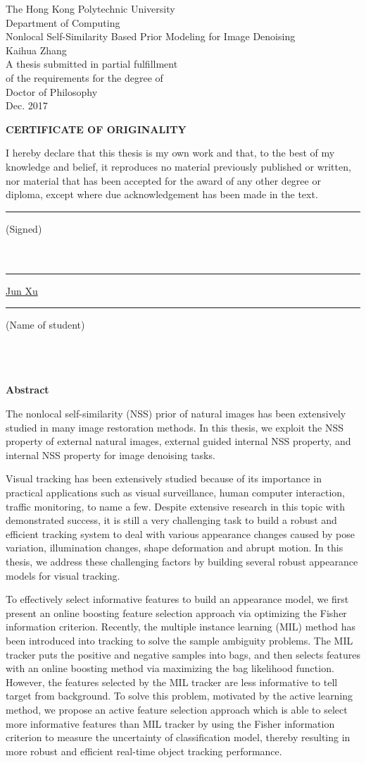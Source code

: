 \documentclass[12pt,oneside]{report}
\makeatletter
\numberwithin{figure}{chapter}
\newenvironment{preliminary}%
{\pagestyle{plain}\pagenumbering{roman}}%
{\pagenumbering{arabic}}
\newcommand\isdefinedsig[1]{%
  \edef\@tempa{#1}%
  \def\@tempb{}%
  \ifx\@tempa\@tempb
	\else\rule[-4.5pt]{4cm}{0.5pt}\signname\\ \\{#1}\\
  \fi
}
\newcommand\isdefinedsigname[1]{%
  \edef\@tempa{#1}%
  \def\@tempb{}%
  \ifx\@tempa\@tempb
	\else\rule[-5pt]{0.05cm}{0.5pt}\underline{Jun Xu}\rule[-5pt]{1.5cm}{0.5pt}\stuname\\ \\{#1}\\%
  \fi
}
\newcommand\isdefinedspinetitle[1]{%
  \edef\@tempa{#1}%
  \def\@tempb{}%
  \ifx\@tempa\@tempb
	\else (Spine title: #1)\\
  \fi
}
\newcommand{\signname}{(Signed)}
\newcommand{\stuname}{(Name of student)}
\newcommand{\department}{Computing}
\newcommand{\degree}{Doctor of Philosophy}
\newcommand{\firstname}{Kaihua}
\newcommand{\middlename}{}
\newcommand{\lastname}{Zhang}
\newcommand{\authorname}{{\firstname} {\middlename} {\lastname}}
\newcommand{\titl}{Real-time and Robust Visual Tracking}
\newcommand{\thesisformat}{Monograph} %
\newcommand{\gyear}{\number\year}
\renewcommand{\maketitle}
{\begin{titlepage}
   \setcounter{page}{1}
   \begin{large}
   \begin{center}
      \mbox{}
      \vfill
	{\LARGE The Hong Kong Polytechnic University} \\
    {\Large Department of Computing}\\
      \vfill
      {\LARGE Nonlocal Self-Similarity Based Prior Modeling for Image Denoising} \\
      \vfill
       {\firstname}  {\lastname}\\

      \vfill
		A thesis submitted in partial fulfillment\\
		of the requirements for the degree of\\
		\degree\\
		\vfill
		\vfill
     Dec. 2017\\
      \vspace*{.2in}


   \end{center}
   \end{large}
   \end{titlepage}

}%
\newcommand{\makecert}{
   \setcounter{page}{2}
\vfill
\begin{center}
\large
\textbf{CERTIFICATE OF ORIGINALITY}\\
\vfill
\end{center}

\vfill
I hereby declare that this thesis is my own work and that, to the best of my knowledge and belief, it reproduces no material previously published or written, nor material that has been accepted for the award of any other degree or diploma, except where due acknowledgement has been made in the text. \\
\vfill
\vfill
\vfill
\hspace{2.5in}\isdefinedsig{ }
\vfill
\hspace{2.5in}\isdefinedsigname{ }\\
\vfill
\vfill
\vfill
\vfill
}
\makeatother
\begin{document}


\begin{preliminary}

\maketitle
{}
\makecert
\newpage


\Large\begin{center}\textbf{Abstract}\end{center}\normalsize


The nonlocal self-similarity (NSS) prior of natural images has been extensively studied in many image restoration methods. In this thesis, we exploit the NSS property of external natural images, external guided internal NSS property, and internal NSS property for image denoising tasks.



Visual tracking has been extensively studied because of its importance in practical applications such as visual surveillance, human computer interaction, traffic monitoring, to name a few. Despite extensive research in this topic with demonstrated success, it is still a very challenging task to build a robust and efficient tracking system to deal with various appearance changes caused by pose variation, illumination changes, shape deformation and abrupt motion. In this thesis, we address these challenging factors by building several robust appearance models for visual tracking.

%
To effectively select informative features to build an appearance model, we first present an online boosting feature selection approach via optimizing the Fisher information criterion. Recently, the multiple instance learning (MIL) method has been introduced into tracking to solve the sample ambiguity problems. The MIL tracker puts the positive and negative samples into bags, and then selects features with an online boosting method via maximizing the bag likelihood function. However, the features selected by the MIL tracker are less informative to tell target from background. To solve this problem, motivated by the active learning method, we propose an active feature selection approach which is able to select more informative features than MIL tracker by using the Fisher information criterion to measure the uncertainty of classification model, thereby resulting in more robust and efficient real-time object tracking performance.


\end{preliminary}
\end{document}
